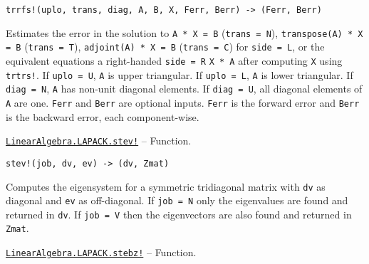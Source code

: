 \begin{adjustwidth}{2em}{0pt}


\begin{verbatim}
trrfs!(uplo, trans, diag, A, B, X, Ferr, Berr) -> (Ferr, Berr)
\end{verbatim}

Estimates the error in the solution to \texttt{A * X = B} (\texttt{trans = N}), \texttt{transpose(A) * X = B} (\texttt{trans = T}), \texttt{adjoint(A) * X = B} (\texttt{trans = C}) for \texttt{side = L}, or the equivalent equations a right-handed \texttt{side = R} \texttt{X * A} after computing \texttt{X} using \texttt{trtrs!}. If \texttt{uplo = U}, \texttt{A} is upper triangular. If \texttt{uplo = L}, \texttt{A} is lower triangular. If \texttt{diag = N}, \texttt{A} has non-unit diagonal elements. If \texttt{diag = U}, all diagonal elements of \texttt{A} are one. \texttt{Ferr} and \texttt{Berr} are optional inputs. \texttt{Ferr} is the forward error and \texttt{Berr} is the backward error, each component-wise.



\end{adjustwidth}
\hypertarget{14670728896781161925}{} 
\hyperlink{14670728896781161925}{\texttt{LinearAlgebra.LAPACK.stev!}}  -- {Function.}

\begin{adjustwidth}{2em}{0pt}


\begin{verbatim}
stev!(job, dv, ev) -> (dv, Zmat)
\end{verbatim}

Computes the eigensystem for a symmetric tridiagonal matrix with \texttt{dv} as diagonal and \texttt{ev} as off-diagonal. If \texttt{job = N} only the eigenvalues are found and returned in \texttt{dv}. If \texttt{job = V} then the eigenvectors are also found and returned in \texttt{Zmat}.



\end{adjustwidth}
\hypertarget{10865649637100518709}{} 
\hyperlink{10865649637100518709}{\texttt{LinearAlgebra.LAPACK.stebz!}}  -- {Function.}

